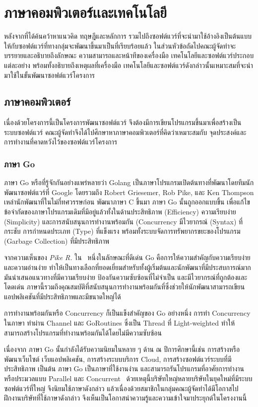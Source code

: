 \documentclass[12pt,one side,openright,a4paper]{cpe-thesis-th}
\newcommand{\thaijustify}[1]{%
  \par\hspace{30pt}\justifying
  #1
}
\begin{document}
\section{ภาษาคอมพิวเตอร์เเละเทคโนโลยี}
    \thaijustify{
        หลังจากที่ได้ค้นคว้าหาแนวคิด ทฤษฎีและหลักการ รวมไปถึงซอฟต์แวร์ที่จะนำมาใช้อ้างอิงเป็นต้นแบบให้กับซอฟต์แวร์ที่ทางกลุ่มจะพัฒนาขึ้นมาเป็นที่เรียบร้อยแล้ว ในส่วนหัวข้อถัดไปคณะผู้จัดทำจะบรรยายและอธิบายถึงลักษณะ ความสามารถและหน้าทีของเครื่องมือ เทคโนโลยีและซอฟต์แวร์ประกอบแต่ละอย่าง พร้อมทั้งอธิบายถึงเหตุผลที่เครื่องมือ เทคโนโลยีและซอฟต์แวร์ดังกล่าวนั้นเหมาะสมที่จะนำมาใช้ในขั้นพัฒนาซอฟต์แวร์โครงการ
    }
    \subsection{ภาษาคอมพิวเตอร์}
        \thaijustify{
            เนื่องด้วยโครงการนี้เป็นโครงการพัฒนาซอฟต์แวร์ จึงต้องมีการเขียนโปรแกรมขึ้นมาเพื่อสร้างเป็นระบบซอฟต์แวร์ คณะผู้จัดทำจึงได้ไปศึกษาหาภาษาคอมพิวเตอร์ที่คิดว่าเหมาะสมกับ จุดประสงค์และการทำงานที่คาดหวังไว้ของซอฟต์แวร์โครงการ
        }
        \subsubsection{ภาษา Go}
            \thaijustify{
                ภาษา Go หรือที่รู้จักกันอย่างแพร่หลายว่า Golang เป็นภาษาโปรแกรมเปิดต้นทางที่พัฒนาโดยทีมนักพัฒนาซอฟต์แวร์ที่ Google โดยรวมถึง Robert Griesemer, Rob Pike, และ Ken Thompson เหล่านักพัฒนาที่ในไม่กี่ทศวรรษก่อน พัฒนาภาษา C ขึ้นมา ภาษา Go นั้นถูกออกแบบขึ้น เพื่อแก้ไขข้อจำกัดของภาษาโปรแกรมเดิมที่มีอยู่แล้วทั้งในด้านประสิทธิภาพ (Efficiency) ความเรียบง่าย (Simplicity) และการสนับสนุนการทำงานพร้อมกัน (Concurrency มีไวยากรณ์ (Syntax) ที่กระชับ การกำหนดประเภท (Type) ที่แข็งแรง พร้อมทั้งระบบจัดการทรัพยากรขยะของโปรแกรม (Garbage Collection) ที่มีประสิทธิภาพ~\cite{pike12go, donovan15go}
            }
            \thaijustify{
                จากความเห็นของ \textit{Pike R.} ใน~\cite{pike12go, pike12godev} หนึ่งในลักษณะที่ดีเด่น Go คือการให้ความสำคัญกับความเรียบง่ายและความอ่านง่าย ทำให้เป็นทางเลือกที่ยอดเยี่ยมสำหรับทั้งผู้เริ่มต้นและนักพัฒนาที่มีประสบการณ์มาก มันนำเสนอแนวทางที่มีความเรียบง่าย ป้องกันความซับซ้อนที่ไม่จำเป็น และมีไวยากรณ์ที่ถูกต้องและโดดเด่น ภาษานี้รวมถึงคุณสมบัติที่สนับสนุนการทำงานพร้อมกันที่ซึ่งช่วยให้นักพัฒนาสามารถเขียนแอปพลิเคชันที่มีประสิทธิภาพและมีขนาดใหญ่ได้
            }
            \thaijustify{
                การทำงานพร้อมกันหรือ Concurrency ก็เป็นแข็งสำคัญของ Go อย่างหนึ่ง การทำ Concurrency ในภาษา ทำผ่าน Channel และ GoRoutines ซึ่งเป็น Thread ที่ Light-weighted ทำให้สามารถสร้างโปรแกรมที่ทำงานพร้อมกันได้โดยไม่มีความซับซ้อน~\cite{donovan15go}
            }
            \thaijustify{
                เนื่องจาก ภาษา Go นั้นกำลังได้รับความนิยมในหลาย ๆ ด้าน ณ ปีการศึกษานี้เช่น การสร้างหรือพัฒนาเว็บไซต์ เว็บแอปพลิเคชัน, การสร้างระบบบริการ Cloud, การสร้างซอฟต์แวร์ระบบที่มีประสิทธิภาพ เป็นต้น ภาษา Go เป็นภาษาที่ใช้งานง่าน และสามารถรันโปรแกรมที่อาศัยการทำงานหรือประมวลแบบ Parallel และ Concurrent~\cite{golangorg} ด้วยเหตุนี้บริษัทใหญ่หลายบริษัทในยุคใหม่ที่มีระบบซอฟต์แวร์ที่ใหญ่ จึงนิยมใช้ภาษาดังกล่าว แล้วเนื่องด้วยสมาชิกในกลุ่มคณะผู้จัดทำได้มีโอกาสไปฝึกงานบริษัทที่ใช้ภาษาดังกล่าว จึงเห็นเป็นโอกาสนำความรู้และความเข้าใจมาประยุกต์ในโครงงานนี้
            }
\end{document}
